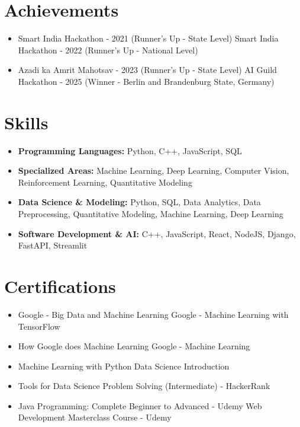 \documentclass[a4paper,10pt]{article}
\begin{document}
\section*{Achievements}
\begin{itemize}
\item Smart India Hackathon - 2021 (Runner's Up - State Level) \hfill Smart India Hackathon - 2022 (Runner's Up - National Level)
\item Azadi ka Amrit Mahotsav - 2023 (Runner's Up - State Level) \hfill AI Guild Hackathon - 2025 (Winner - Berlin and Brandenburg State, Germany)
\end{itemize}

\section*{Skills}
\begin{itemize}
  \item \textbf{Programming Languages:} Python, C++, JavaScript, SQL
  \item \textbf{Specialized Areas:} Machine Learning, Deep Learning, Computer Vision, Reinforcement Learning, Quantitative Modeling
  \item \textbf{Data Science \& Modeling:} Python, SQL, Data Analytics, Data Preprocessing, Quantitative Modeling, Machine Learning, Deep Learning
  \item \textbf{Software Development \& AI:} C++, JavaScript, React, NodeJS, Django, FastAPI, Streamlit
\end{itemize}

\section*{Certifications}
\begin{itemize}
\item Google - Big Data and Machine Learning \hfill Google - Machine Learning with TensorFlow
\item How Google does Machine Learning \hfill Google - Machine Learning
\item Machine Learning with Python \hfill Data Science Introduction
\item Tools for Data Science \hfill Problem Solving (Intermediate) - HackerRank
\item Java Programming: Complete Beginner to Advanced - Udemy \hfill Web Development Masterclass Course - Udemy
\end{itemize}
\end{document}
